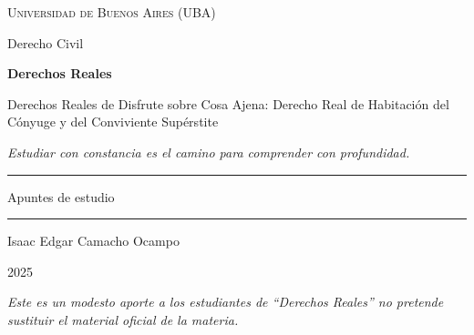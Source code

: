 \documentclass[12pt,oneside]{book}
\newcommand{\universidad}{Universidad de Buenos Aires (UBA)}
\newcommand{\area}{Derecho Civil}
\newcommand{\materia}{Derechos Reales}
\newcommand{\titulo}{Derechos Reales de Disfrute sobre Cosa Ajena: Derecho Real de Habitación del Cónyuge y del Conviviente Supérstite}
\newcommand{\autor}{Isaac Edgar Camacho Ocampo}
\newcommand{\anio}{2025}
\begin{document}
\frontmatter

\begin{titlepage}

\thispagestyle{empty}

\begin{center}

\vspace*{1cm}

{\large \textsc{\universidad}}

\vspace{0.2cm}

{\large \area}

\vspace{3cm}

{\Huge \textbf{\materia}}

\vspace{1cm}

{\Large \titulo}

\vspace{0.8cm}

\textit{Estudiar con constancia es el camino para comprender con profundidad.}

\vspace{1.2cm}

\rule{0.70\textwidth}{0.5pt}

\vspace{0.5cm}

{\large Apuntes de estudio}

\vspace{0.5cm}

\rule{0.70\textwidth}{0.5pt}

\vfill

{\large \autor}

\vspace{0.3cm}

{\large \anio}

\end{center}

\vfill

\begin{flushleft}
\textit{Este es un modesto aporte a los estudiantes de ``Derechos Reales'' no pretende sustituir el material oficial de la materia.}
\end{flushleft}

\end{titlepage}

\tableofcontents
\end{document}
